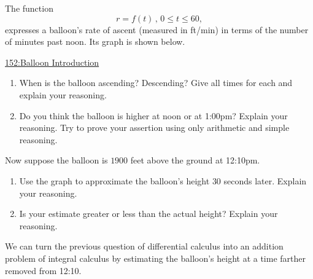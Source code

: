 \documentclass{ximera}
\begin{document}
\begin{example}  \label{Ex:98dfrghha}

The function 
\[
    r = f(t) \, , \, 0\leq t \leq  60 , 
\]
expresses a balloon's rate of ascent (measured in ft/min) in terms of the number of minutes past noon. Its graph is shown below.

\begin{onlineOnly}
    \begin{center}
\end{center}
\end{onlineOnly}

\href{https://www.desmos.com/calculator/tgi5yiuzab}{152:Balloon Introduction}

\begin{enumerate}

\item When is the balloon ascending? Descending? Give all times for each and explain your reasoning.

\item Do you think the balloon is higher at noon or at 1:00pm? Explain your reasoning. Try to prove your assertion using only arithmetic and simple reasoning.

\begin{freeResponse}
\end{freeResponse}

\end{enumerate}


Now suppose the balloon is $1900$ feet above the ground at 12:10pm. 

\begin{enumerate}

\item Use the graph to approximate the balloon's height $30$ seconds later. Explain your reasoning.

\item Is your estimate greater or less than the actual height? Explain your reasoning.
\end{enumerate}

\begin{freeResponse}
\end{freeResponse}

\end{example}

We can turn the previous question of differential calculus into an addition problem of integral calculus by estimating the balloon's height at a time farther removed from 12:10. 
\end{document}
